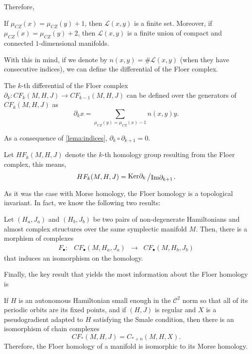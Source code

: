Therefore,

\begin{lema} \label{lema:indices}
If $\mu_{CZ}(x) = \mu_{CZ}(y) + 1$, then $\mathcal{L}(x,y)$ is a finite set. Moreover, if $\mu_{CZ}(x) = \mu_{CZ}(y) + 2$, then $\mathcal{L}(x,y)$ is a finite union of compact and connected $1$-dimensional manifolds.
\end{lema}

With this in mind, if we denote by $n(x,y) = \# \mathcal{L}(x,y)$ (when they have consecutive indices), we can define the differential of the Floer complex.

\begin{deff}
The $k$-th differential of the Floer complex $\partial_k : CF_k(M,H,J) \rightarrow CF_{k-1}(M,H,J)$ can be defined over the generators of $CF_k(M,H,J)$ as
\[\partial_kx = \sum_{\mu_{CZ}(y) = \mu_{CZ}(x) -1} n(x,y)y .\]
\end{deff}

As a consequence of \ref{lema:indices}, $\partial_k \circ \partial_{k+1} = 0$.

Let $HF_k(M,H,J)$ denote the $k$-th homology group resulting from the Floer complex, this means,
\[HF_k(M,H,J) = \quocient{\mathrm{Ker}\partial_k}{\mathrm{Im}\partial_{k+1}} .\]

As it was the case with Morse homology, the Floer homology is a topological invariant. In fact, we know the following two results:

\begin{theo} \label{theo:invariance}
Let $(H_a,J_a)$ and $(H_b,J_b)$ be two pairs of non-degenerate Hamiltonians and almost complex structures over the same symplectic manifold $M$. Then, there is a morphism of complexes
\[\begin{array}{rccc} F_{\bullet} : & CF_{\bullet}(M,H_a,J_a) & \rightarrow & CF_{\bullet}(M,H_b,J_b) \end{array} \]
that induces an isomorphism on the homology.
\end{theo}

Finally, the key result that yields the most information about the Floer homology is

\begin{theo} \label{theo:floer_morse}
If $H$ is an autonomous Hamiltonian small enough in the $\mathcal{C}^2$ norm so that all of its periodic orbits are its fixed points, and if $(H,J)$ is regular and $X$ is a pseudogradient adapted to $H$ satisfying the Smale condition, then there is an isomorphism of chain complexes
\[CF_{\ast}(M,H,J) = C_{\ast+n}(M,H,X).\]
Therefore, the Floer homology of a manifold is isomorphic to its Morse homology.
\end{theo}
